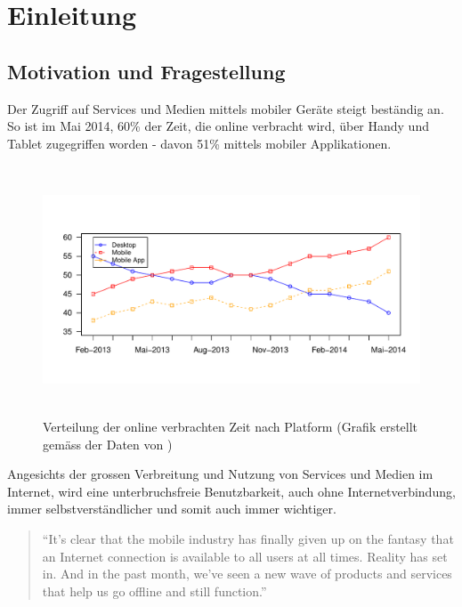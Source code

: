 \documentclass[oneside,11pt,parskip=half,ngerman]{scrreprt}
\title{\bigskip \bigskip }
\author{}
\makeatletter
\def\maxwidth{\ifdim\Gin@nat@width>\linewidth\linewidth
\else\Gin@nat@width\fi}
\let\Oldincludegraphics\includegraphics
\renewcommand{\includegraphics}[1]{\Oldincludegraphics[width=\maxwidth,height=20em,keepaspectratio]{#1}}
\makeatother
\begin{document}
  
\maketitle

\chapter{Einleitung}\label{einleitung}

\section{Motivation und
Fragestellung}\label{motivation-und-fragestellung}

Der Zugriff auf Services und Medien mittels mobiler Geräte steigt
beständig an. So ist im Mai 2014, 60\% der Zeit, die online verbracht
wird, über Handy und Tablet zugegriffen worden - davon 51\% mittels
mobiler Applikationen. \autocite{comescore-mobiletrends}

\begin{figure}[htbp]
\centering
\includegraphics{img/Share-of-US-Digital-Media-Time-Spent-by-Platform.pdf}
\caption{Verteilung der online verbrachten Zeit nach Platform (Grafik
erstellt gemäss der Daten von \autocite{comescore-mobiletrends})}
\end{figure}

Angesichts der grossen Verbreitung und Nutzung von Services und Medien
im Internet, wird eine unterbruchsfreie Benutzbarkeit, auch ohne
Internetverbindung, immer selbstverständlicher und somit auch immer
wichtiger.

\begin{quote}
\enquote{It's clear that the mobile industry has finally given up on the
fantasy that an Internet connection is available to all users at all
times. Reality has set in. And in the past month, we've seen a new wave
of products and services that help us go offline and still function.}
\textcite{cw-mobiletrends}
\end{quote}
\end{document}
